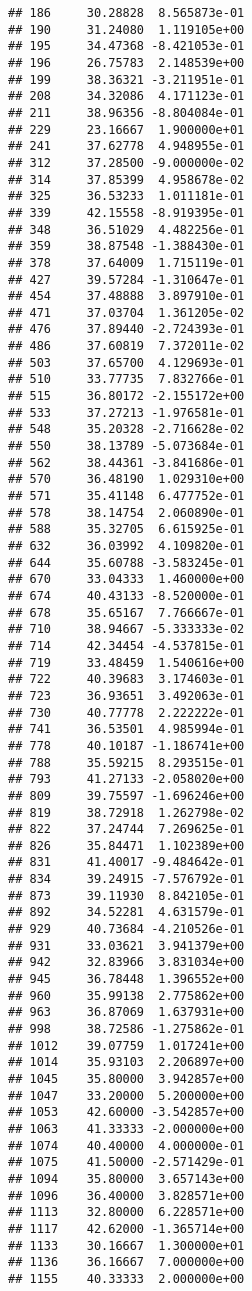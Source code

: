 \documentclass[
]{article}
\begin{document}
\begin{verbatim}
## 186     30.28828  8.565873e-01
## 190     31.24080  1.119105e+00
## 195     34.47368 -8.421053e-01
## 196     26.75783  2.148539e+00
## 199     38.36321 -3.211951e-01
## 208     34.32086  4.171123e-01
## 211     38.96356 -8.804084e-01
## 229     23.16667  1.900000e+01
## 241     37.62778  4.948955e-01
## 312     37.28500 -9.000000e-02
## 314     37.85399  4.958678e-02
## 325     36.53233  1.011181e-01
## 339     42.15558 -8.919395e-01
## 348     36.51029  4.482256e-01
## 359     38.87548 -1.388430e-01
## 378     37.64009  1.715119e-01
## 427     39.57284 -1.310647e-01
## 454     37.48888  3.897910e-01
## 471     37.03704  1.361205e-02
## 476     37.89440 -2.724393e-01
## 486     37.60819  7.372011e-02
## 503     37.65700  4.129693e-01
## 510     33.77735  7.832766e-01
## 515     36.80172 -2.155172e+00
## 533     37.27213 -1.976581e-01
## 548     35.20328 -2.716628e-02
## 550     38.13789 -5.073684e-01
## 562     38.44361 -3.841686e-01
## 570     36.48190  1.029310e+00
## 571     35.41148  6.477752e-01
## 578     38.14754  2.060890e-01
## 588     35.32705  6.615925e-01
## 632     36.03992  4.109820e-01
## 644     35.60788 -3.583245e-01
## 670     33.04333  1.460000e+00
## 674     40.43133 -8.520000e-01
## 678     35.65167  7.766667e-01
## 710     38.94667 -5.333333e-02
## 714     42.34454 -4.537815e-01
## 719     33.48459  1.540616e+00
## 722     40.39683  3.174603e-01
## 723     36.93651  3.492063e-01
## 730     40.77778  2.222222e-01
## 741     36.53501  4.985994e-01
## 778     40.10187 -1.186741e+00
## 788     35.59215  8.293515e-01
## 793     41.27133 -2.058020e+00
## 809     39.75597 -1.696246e+00
## 819     38.72918  1.262798e-02
## 822     37.24744  7.269625e-01
## 826     35.84471  1.102389e+00
## 831     41.40017 -9.484642e-01
## 834     39.24915 -7.576792e-01
## 873     39.11930  8.842105e-01
## 892     34.52281  4.631579e-01
## 929     40.73684 -4.210526e-01
## 931     33.03621  3.941379e+00
## 942     32.83966  3.831034e+00
## 945     36.78448  1.396552e+00
## 960     35.99138  2.775862e+00
## 963     36.87069  1.637931e+00
## 998     38.72586 -1.275862e-01
## 1012    39.07759  1.017241e+00
## 1014    35.93103  2.206897e+00
## 1045    35.80000  3.942857e+00
## 1047    33.20000  5.200000e+00
## 1053    42.60000 -3.542857e+00
## 1063    41.33333 -2.000000e+00
## 1074    40.40000  4.000000e-01
## 1075    41.50000 -2.571429e-01
## 1094    35.80000  3.657143e+00
## 1096    36.40000  3.828571e+00
## 1113    32.80000  6.228571e+00
## 1117    42.62000 -1.365714e+00
## 1133    30.16667  1.300000e+01
## 1136    36.16667  7.000000e+00
## 1155    40.33333  2.000000e+00

\end{verbatim}
\end{document}
